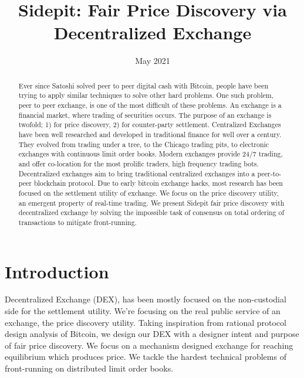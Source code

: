 \documentclass[12pt]{article}
\title{Sidepit: Fair Price Discovery via Decentralized Exchange}
\date{May 2021}
\begin{document}
\parindent 0cm
\parskip   6pt
\maketitle




\begin{abstract}
Ever since Satoshi solved peer to peer digital cash with Bitcoin, people have been trying to apply similar techniques to solve other hard problems. One such problem, peer to peer exchange, is one of the most difficult of these problems. An exchange is a financial market, where trading of securities occurs. The purpose of an exchange is twofold; 1) for price discovery, 2) for counter-party settlement. Centralized Exchanges have been well researched and developed in traditional finance for well over a century. They evolved from trading under a tree, to the Chicago trading pits, to electronic exchanges with continuous limit order books. Modern exchanges provide 24/7 trading, and offer co-location for the most prolific traders, high frequency trading bots. Decentralized exchanges aim to bring traditional centralized exchanges into a peer-to-peer blockchain protocol. Due to early bitcoin exchange hacks, most research has been focused on the settlement utility of exchange. We focus on the price discovery utility, an emergent property of real-time trading. We present Sidepit fair price discovery with decentralized exchange by solving the impossible task of consensus on total ordering of transactions to mitigate front-running. 
\end{abstract}

\section*{Introduction}
Decentralized Exchange (DEX), has been mostly focused on the non-custodial side for the settlement utility. We're focusing on the real public service of an exchange, the price discovery utility. Taking inspiration from rational protocol design analysis of Bitcoin, we design our DEX with a designer intent and purpose of fair price discovery. We focus on a mechanism designed exchange for reaching equilibrium which produces price. We tackle the hardest technical problems of front-running on distributed limit order books.    
\end{document}
